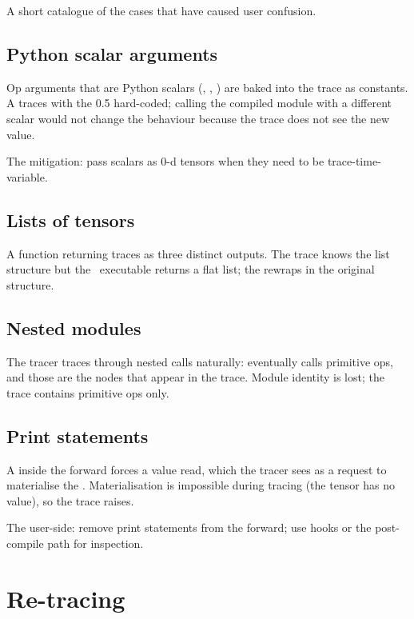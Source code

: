 A short catalogue of the cases that have caused user confusion.

\subsection{Python scalar arguments}
\label{ssec:tracer:py_scalar}

Op arguments that are Python scalars (, ,
) are baked into the trace as constants. A
 traces with the 0.5 hard-coded; calling
the compiled module with a different scalar would not change the
behaviour because the trace does not see the new value.

The mitigation: pass scalars as 0-d tensors when they need to be
trace-time-variable.

\subsection{Lists of tensors}
\label{ssec:tracer:tensor_lists}

A function returning \code{[t1, t2, t3]} traces as three
distinct outputs. The trace knows the list structure but the
\MPSGraph\ executable returns a flat list; the
 rewraps in the original structure.

\subsection{Nested modules}
\label{ssec:tracer:nested_modules}

The tracer traces through nested  calls naturally:
 eventually calls primitive ops, and those are
the nodes that appear in the trace. Module identity is lost; the
trace contains primitive ops only.

\subsection{Print statements}
\label{ssec:tracer:print_statements}

A  inside the forward forces a value read,
which the tracer sees as a request to materialise the
. Materialisation is impossible during
tracing (the tensor has no value), so the trace raises.

The user-side: remove print statements from the forward; use
hooks or the post-compile path for inspection.

\section{Re-tracing}
\label{sec:tracer:retracing}

